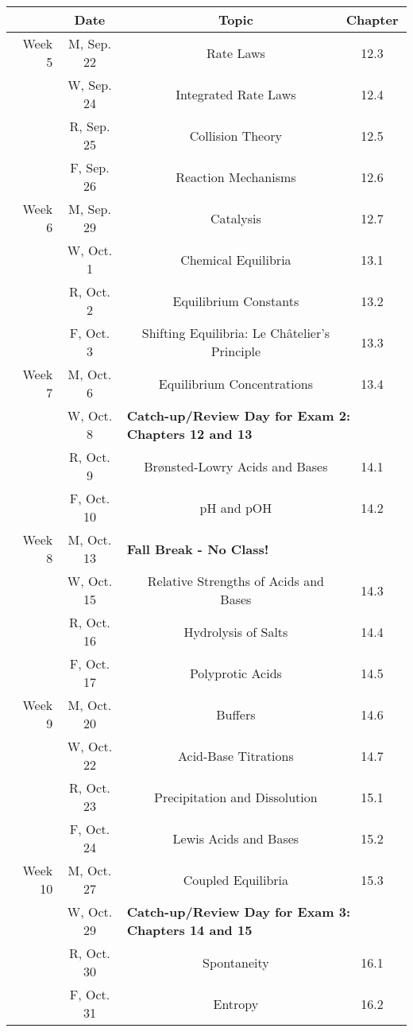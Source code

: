 \documentclass[12pt, letterpaper]{article}
\begin{document}
\begin{tabular}{rcccc}
& Date && Topic & Chapter\\
\midrule
Week 5 & M, Sep. 22&& Rate Laws & 12.3\\
& W, Sep. 24&& Integrated Rate Laws & 12.4\\
& R, Sep. 25&& Collision Theory & 12.5\\
& F, Sep. 26&& Reaction Mechanisms & 12.6\\
\midrule
Week 6 & M, Sep. 29&& Catalysis & 12.7\\
& W, Oct. 1&& Chemical Equilibria & 13.1\\
& R, Oct. 2&& Equilibrium Constants & 13.2\\
& F, Oct. 3&& Shifting Equilibria: Le Ch\^atelier's Principle & 13.3\\
\midrule
Week 7 & M, Oct. 6&& Equilibrium Concentrations & 13.4\\
& W, Oct. 8& \multicolumn{3}{l}{\textbf{Catch-up/Review Day for Exam 2: Chapters 12 and 13}}\\
& R, Oct. 9&& Brønsted-Lowry Acids and Bases & 14.1\\
& F, Oct. 10&& pH and pOH & 14.2\\
\midrule
Week 8 & M, Oct. 13& \multicolumn{3}{l}{\textbf{Fall Break - No Class!}}\\
& W, Oct. 15&& Relative Strengths of Acids and Bases & 14.3\\
& R, Oct. 16&& Hydrolysis of Salts & 14.4\\
& F, Oct. 17&& Polyprotic Acids & 14.5\\
\midrule
Week 9 & M, Oct. 20&& Buffers & 14.6\\
& W, Oct. 22&& Acid-Base Titrations & 14.7\\
& R, Oct. 23&& Precipitation and Dissolution & 15.1\\
& F, Oct. 24&& Lewis Acids and Bases & 15.2\\
\midrule
Week 10 & M, Oct. 27&& Coupled Equilibria & 15.3\\
& W, Oct. 29& \multicolumn{3}{l}{\textbf{Catch-up/Review Day for Exam 3: Chapters 14 and 15}}\\
& R, Oct. 30&& Spontaneity & 16.1\\
& F, Oct. 31&& Entropy & 16.2\\
\end{tabular}
\end{document}
